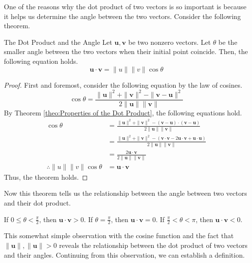 \documentclass[../../main.tex]{subfiles}
\begin{document}
One of the reasons why the dot product of two vectors is so important
is because it helps us determine the angle between the two vectors.
Consider the following theorem.

\begin{theorem}{}{The Dot Product and the Angle}
Let $\mathbf{u}, \mathbf{v}$ be two nonzero vectors. Let $\theta$ be
the smaller angle between the two vectors when their initial point
coincide. Then, the following equation holds.
\[
\mathbf{u} \cdot \mathbf{v}
= \| u \| \| v \| \cos\theta
\]
\end{theorem}
\begin{proof}
First and foremost, consider the following equation by the law of
cosines.
\[
\cos\theta
= \frac{ \| \mathbf{u} \|^2 + \| \mathbf{v} \|^2 -
    \| \mathbf{v} - \mathbf{u} \|^2
}{ 2 \| \mathbf{u} \| \| \mathbf{v} \| }
\]
By Theorem \ref{theo:Properties of the Dot Product}, the following
equations hold.
\begin{align*}
    \cos\theta
    &= \frac{ \| \mathbf{u} \|^2 + \| \mathbf{v} \|^2 -
        ( \mathbf{v} - \mathbf{u} ) \cdot ( \mathbf{v} - \mathbf{u} )
    }{ 2 \| \mathbf{u} \| \| \mathbf{v} \| } \\
    &= \frac{ \| \mathbf{u} \|^2 + \| \mathbf{v} \|^2 - \left(
        \mathbf{v} \cdot \mathbf{v}  - 2 \mathbf{u} \cdot \mathbf{v}
            + \mathbf{u} \cdot \mathbf{u}
        \right)
    }{ 2 \| \mathbf{u} \| \| \mathbf{v} \| } \\
    &= \frac{2 \mathbf{u} \cdot \mathbf{v}}
        { 2 \| \mathbf{u} \| \| \mathbf{v} \| } \\
    \therefore 
    \| u \| \| v \| \cos\theta
    &= \mathbf{u} \cdot \mathbf{v}
\end{align*}
Thus, the theorem holds.
\end{proof}

Now this theorem tells us the relationship between the angle between
two vectors and their dot product.

\begin{important}
If $0 \leq \theta < \frac{\pi}{2}$, then $\mathbf{u} \cdot \mathbf{v}
> 0$. If $\theta = \frac{\pi}{2}$, then $\mathbf{u} \cdot \mathbf{v}
= 0$. If $\frac{\pi}{2} < \theta < \pi$, then $\mathbf{u} \cdot
\mathbf{v} < 0$.
\end{important}

This somewhat simple observation with the cosine function and the
fact that $\| \mathbf{u} \|, \| \mathbf{u} \| > 0$ reveals the
relationship between the dot product of two vectors and their angles.
Continuing from this observation, we can establish a definition.
\end{document}
